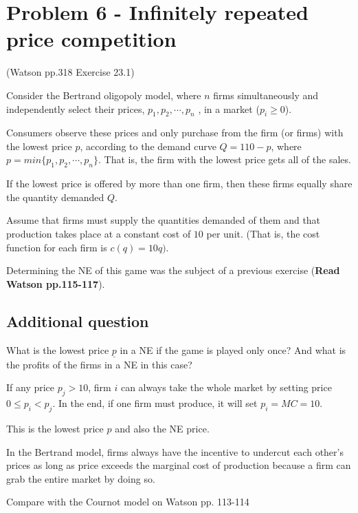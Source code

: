 \documentclass{article}
\begin{document}
\section{Problem 6 - Infinitely repeated price competition}

(Watson pp.318 Exercise 23.1)


Consider the Bertrand oligopoly model, where $n$ firms simultaneously and independently
select their prices, $p_1 , p_2 , \cdots , p_n$ , in a market ($p_i \ge 0$). 

\smallskip

Consumers observe these prices and only purchase
from the firm (or firms) with the lowest price $p$, according to the demand
curve $Q = 110 - p$, where $p = min\{p_1 , p_2 , \cdots , p_n\}$. That is, the firm with the lowest price gets all of the sales. 

\smallskip

If the lowest price is offered by more than
one firm, then these firms equally share the quantity demanded $Q$. 

\smallskip

Assume that firms must supply the quantities demanded of them and that production takes place at a constant cost of $10$ per unit. (That is, the cost function for each firm is $c (q) = 10q)$. 

\smallskip

Determining the NE of this game was the subject of a previous exercise (\textbf{Read Watson pp.115-117}).


\subsection*{Additional question}

What is the lowest price $\underline{p}$ in a NE if the game is played only once? And what is the profits of the firms in a NE in this case? 


If any price $p_j>10$, firm $i$ can always take the whole market by setting 
price $0 \le p_i <p_j$. In the end, if one firm must produce, it will set
$p_i = MC = 10$.

\smallskip

This is the lowest price $p$ and also the NE price.

\begin{mdframed}[backgroundcolor=blue!20,linecolor=white]

In the Bertrand model, firms always have the incentive to undercut each other’s prices as long as price exceeds the marginal
cost of production because a firm can grab the entire market by doing so. 

\medskip

Compare with the Cournot model on Watson pp. 113-114

\end{mdframed}
\end{document}
